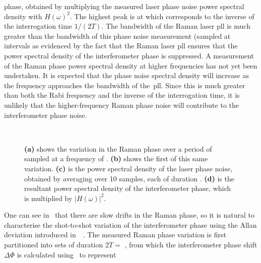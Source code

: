 phase, obtained by multiplying the measured laser phase noise power spectral
density with $H(\omega)^2$. The highest peak is at
 which corresponds to the inverse of the
interrogation time $1/(2T)$. The bandwidth of the Raman laser
\ac{pll} is much greater than the 
 bandwidth of this phase noise measurement (sampled
at  intervals as evidenced by the fact that
the Raman laser \ac{pll} ensures that
the power spectral density of the interferometer phase is suppressed.
A measurement of the Raman phase power spectral density at higher frequencies has
not yet been undertaken. It is expected that the phase noise spectral
density will increase as the frequency approaches the bandwidth of
the~\ac{pll}. Since this is much greater than both the Rabi frequency
and the inverse of the interrogation time, it is unlikely that the
higher-frequency Raman phase noise will contribute to the interferometer
phase noise.
\begin{figure}[htpb!]
  \centering
{}
\\
\caption[Interferometer phase noise due to the Raman
phase]{\textbf{(a)}
  shows the variation in the Raman phase over a period of
   sampled at a frequency of .
  \textbf{(b)} shows the first  of this same variation.
  \textbf{(c)} is the power spectral density of the laser phase noise,
  obtained by averaging over 10 samples, each of duration
  .
  \textbf{(d)} is the resultant power spectral density of the
interferometer phase, which is multiplied by $|H(\omega)|^2$.}
  \label{fig:laser_phase_noise}
\end{figure}
\par\noindent
One can see in~ that there are slow
drifts in the Raman phase, 
so it is natural to characterise the shot-to-shot variation of the
interferometer phase using the
Allan deviation introduced
in~~\nocite{Gouet2008}. The measured Raman phase
variation is first partitioned into sets of duration
$2T = $ , from which the interferometer phase shift $\Delta
\Phi$ is calculated using~ to represent
